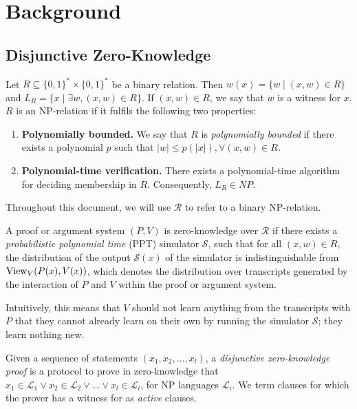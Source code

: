 \section{Background}
\label{sec:background}

\subsection{Disjunctive Zero-Knowledge}

\begin{definition}[NP Relations]
Let $R \subseteq \{0,1\}^* \times \{0,1\}^*$ be a binary relation. Then $w(x) = \{w \mid (x,w) \in R\}$ and $L_R = \{x \mid \exists w, (x,w) \in R\}$. If $(x,w) \in R$, we say that $w$ is a witness for $x$. $R$ is an NP-relation if it fulfils the following two properties:
\begin{enumerate}
    \item \textbf{Polynomially bounded.} We say that $R$ is \textit{polynomially bounded} if there exists a polynomial $p$ such that $|w| \le p(|x|), \forall (x,w) \in R$. 
    \item \textbf{Polynomial-time verification.} There exists a polynomial-time algorithm for deciding membership in $R$. Consequently, $L_R \in NP$. 
\end{enumerate}

Throughout this document, we will use $\mathcal R$ to refer to a binary NP-relation.
\end{definition}

\begin{definition}
A proof or argument system $(P,V)$ is zero-knowledge over $\mathcal R$ if there exists a \textit{probabilistic polynomial time} (PPT) simulator $\mathcal S$, such that for all $(x,w) \in R$, the distribution of the output $\mathcal S(x)$ of the simulator is indistinguishable from $\text{View}_V(P(x),V(x))$, which denotes the distribution over transcripts generated by the interaction of $P$ and $V$ within the proof or argument system.
\end{definition}

Intuitively, this means that $V$ should not learn anything from the transcripts  with $P$ that they cannot already learn on their own by running the simulator $\mathcal S$; they learn nothing new.

\begin{definition}
Given a sequence of statements $(x_1,x_2,\ldots, x_l)$, a \textit{disjunctive zero-knowledge proof} is a protocol to prove in zero-knowledge that $x_1 \in \mathcal L_1 \lor x_2 \in \mathcal L_2 \lor \ldots \lor x_l \in \mathcal L_l$, for NP languages $\mathcal L_i$. We term clauses for which the prover has a witness for as \textit{active} clauses. 
\end{definition}

